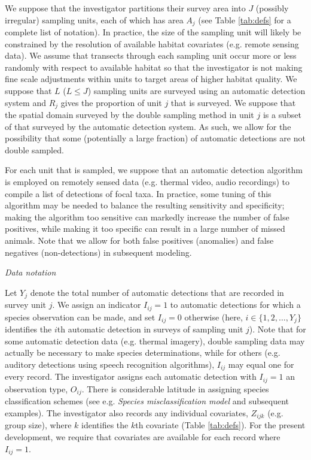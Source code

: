 \documentclass[12pt,fleqn]{article}
\begin{document}
\begin{flushleft}
We suppose that the investigator partitions their survey area into $J$ (possibly irregular) sampling units, each of which has area $A_j$ (see Table \ref{tab:defs} for a complete list of notation).  In practice, the size of the sampling unit will likely be constrained by the resolution of available habitat covariates (e.g. remote sensing data).  We assume that transects through each sampling unit occur more or less randomly with respect to available habitat so that the investigator is not making fine scale adjustments within units to target areas of higher habitat quality.
We suppose that $L$ ($L \le J$) sampling units are surveyed using an automatic detection system and $R_j$ gives the proportion of unit $j$ that is surveyed.  We suppose that the spatial domain surveyed by the double sampling method in unit $j$ is a subset of that surveyed by the automatic detection system.  As such, we allow for the possibility that some (potentially a large fraction) of automatic detections are not double sampled.

\hspace{.5in}For each unit that is sampled, we suppose that an automatic detection algorithm is employed on remotely sensed data (e.g. thermal video, audio recordings) to compile a list of detections of focal taxa. In practice, some tuning of this algorithm may be needed to balance the resulting sensitivity and specificity; making the algorithm too sensitive can markedly increase the number of false positives, while making it too specific can result in a large number of missed animals.  Note that we allow for both false positives (anomalies) and false negatives (non-detections) in subsequent modeling.

\vspace{.15in}
{\it Data notation} \\
\vspace{.15in}

\hspace{.5in}Let $Y_j$ denote the total number of automatic detections that are
recorded in survey unit $j$.  We assign an indicator $I_{ij}=1$ to automatic detections for which a species observation can be made, and set $I_{ij}=0$ otherwise (here, $i \in \{ 1,2,\hdots,Y_j \}$ identifies the $i$th automatic detection in surveys of sampling unit $j$).  Note that for some automatic detection data (e.g. thermal imagery), double sampling data may actually be necessary to make species determinations, while for others (e.g. auditory detections using speech recognition algorithms), $I_{ij}$ may equal one for every record.  The investigator assigns each automatic detection with $I_{ij}=1$ an observation type, $O_{ij}$.  There is considerable latitude in assigning species classification schemes (see e.g. {\it Species misclassification model} and subsequent examples).  The investigator also records any individual covariates, $Z_{ijk}$ (e.g. group size), where $k$ identifies the $k$th covariate (Table \ref{tab:defs}).  For the present development, we require that covariates are available for each record where $I_{ij}=1$.



\end{flushleft}
\end{document}
